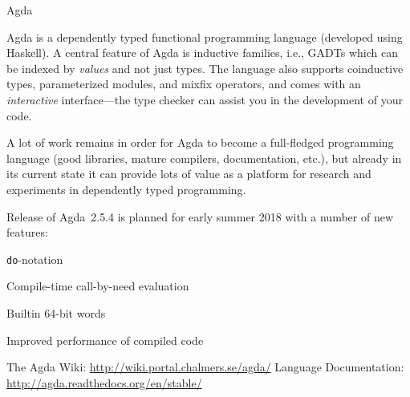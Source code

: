 \begin{hcarentry}[updated]{Agda}
\label{agda}
\makeheader

Agda is a dependently typed functional programming language (developed
using Haskell). A central feature of Agda is inductive families,
i.e., GADTs which can be indexed by \emph{values} and not just types.
The language also supports coinductive types, parameterized modules,
and mixfix operators, and comes with an \emph{interactive}
interface---the type checker can assist you in the development of your
code.

A lot of work remains in order for Agda to become a full-fledged
programming language (good libraries, mature compilers, documentation,
etc.), but already in its current state it can provide lots of value as a
platform for research and experiments in dependently typed programming.

Release of Agda~2.5.4 is planned for early summer 2018 with a number of
new features:
\begin{compactitem}
\item {\tt do}-notation
\item Compile-time call-by-need evaluation
\item Builtin 64-bit words
\item Improved performance of compiled code
\end{compactitem}

\FurtherReading
  The Agda Wiki: \url{http://wiki.portal.chalmers.se/agda/}
  Language Documentation: \url{http://agda.readthedocs.org/en/stable/}
\end{hcarentry}
